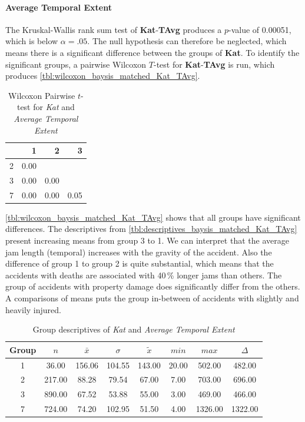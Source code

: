 \paragraph{Average Temporal Extent}
The Kruskal-Wallis rank sum test of \textbf{Kat}-\textbf{TAvg} produces a $p$-value of 0.00051, which is below $\alpha=.05$. The null hypothesis can therefore be neglected, which means there is a significant difference between the groups of \textbf{Kat}. To identify the significant groups, a pairwise Wilcoxon $T$-test for \textbf{Kat}-\textbf{TAvg} is run, which produces \autoref{tbl:wilcoxon_baysis_matched_Kat_TAvg}.
\begin{table}[ht]
	\small
	\centering
	\begin{tabular}{rrrr}
	  	\toprule
	 	& 1 & 2 & 3 \\ 
	  	\midrule
		2 & 0.00 &  &  \\ 
	  	3 & 0.00 & 0.00 &  \\ 
	  	7 & 0.00 & 0.00 & 0.05 \\ 
	   	\bottomrule
	\end{tabular}
	\caption{Wilcoxon Pairwise $t$-test for \textit{Kat} and \textit{Average Temporal Extent}}
	\label{tbl:wilcoxon_baysis_matched_Kat_TAvg}
\end{table}
\autoref{tbl:wilcoxon_baysis_matched_Kat_TAvg} shows that all groups have significant differences. The descriptives from \autoref{tbl:descriptives_baysis_matched_Kat_TAvg} present increasing means from group 3 to 1.	We can interpret that the average jam length (temporal) increases with the gravity of the accident. Also the difference of group 1 to group 2 is quite substantial, which means that the accidents with deaths are associated with 40\,\% longer jams than others. The group of accidents with property damage does significantly differ from the others. A comparisons of means puts the group in-between of accidents with slightly and heavily injured.
\begin{table}[ht]
	\small
	\centering
	\begin{tabular}{c|c|c|c|c|c|c|c}
	  	\toprule
		Group & $n$ & $\bar{x}$ & $\sigma$ & $\tilde{x}$ & $min$ & $max$ & $\Delta$ \\ 
	  	\midrule
		1 &  36.00 & 156.06 & 104.55 & 143.00 & 20.00 & 502.00 & 482.00 \\ 
	  	2 & 217.00 & 88.28 & 79.54 & 67.00 & 7.00 & 703.00 & 696.00 \\ 
	  	3 & 890.00 & 67.52 & 53.88 & 55.00 & 3.00 & 469.00 & 466.00 \\ 
	  	7 & 724.00 & 74.20 & 102.95 & 51.50 & 4.00 & 1326.00 & 1322.00 \\ 
	   	\bottomrule
	\end{tabular}
	\caption{Group descriptives of \textit{Kat} and \textit{Average Temporal Extent}}
	\label{tbl:descriptives_baysis_matched_Kat_TAvg}
\end{table}

